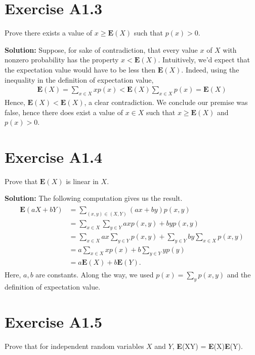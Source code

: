 \documentclass{book}
\begin{document}
\section*{Exercise A1.3}
    Prove there exists a value of $x\geq\textbf{E}(X)$ such that $p(x)>0$.
    
    \textbf{Solution:} Suppose, for sake of contradiction, that every value $x$ of $X$ with nonzero probability has the property $x < \textbf{E}(X)$. Intuitively, we'd expect that the expectation value would have to be less then $\textbf{E}(X)$. Indeed, using the inequality in the definition of expectation value,
    \begin{align}
        \textbf{E}(X) = \sum_{x\in X} x p(x) < \textbf{E}(X)\sum_{x\in X}p(x) = \textbf{E}(X)
    \end{align}
    Hence, $\textbf{E}(X)<\textbf{E}(X)$, a clear contradiction. We conclude our premise was false, hence there does exist a value of $x\in X$ such that $x \geq \textbf{E}(X)$ and $p(x)>0$.

\section*{Exercise A1.4} 
    Prove that $\textbf{E}(X)$ is linear in $X$.
    
    \textbf{Solution:} The following computation gives us the result.
    \begin{align}
    \begin{aligned}
        \textbf{E}(aX+bY) &= \sum_{(x,y)\in(X,Y)}(ax+by)p(x,y) \\
        &= \sum_{x\in X}\sum_{y\in Y}axp(x,y) + byp(x,y) \\
        &=\sum_{x\in X}ax\sum_{y\in Y}p(x,y) + \sum_{y\in Y}by\sum_{x\in X}p(x,y) \\
        &=a\sum_{x\in X}x p(x) + b\sum_{y\in Y}yp(y) \\
        &=a\textbf{E}(X) + b\textbf{E}(Y).
    \end{aligned}
    \end{align}
    Here, $a,b$ are constants. Along the way, we used $p(x) = \sum_y p(x,y)$ and the definition of expectation value.

\section*{Exercise A1.5}
    Prove that for independent random variables $X$ and $Y$, \textbf{E}(XY) = \textbf{E}(X)\textbf{E}(Y).
    
\end{document}
